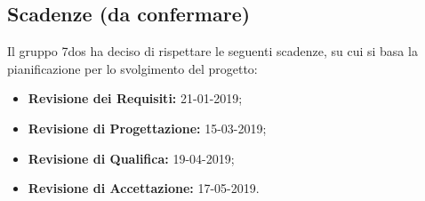 \subsection{Scadenze (da confermare)}
Il gruppo 7dos ha deciso di rispettare le seguenti scadenze, su cui si basa la pianificazione per lo svolgimento del progetto:
\begin{itemize}
	\item \textbf{Revisione dei Requisiti:} 21-01-2019;
	\item \textbf{Revisione di Progettazione:} 15-03-2019;
	\item \textbf{Revisione di Qualifica:} 19-04-2019;
	\item \textbf{Revisione di Accettazione:} 17-05-2019.
\end{itemize}

\pagebreak